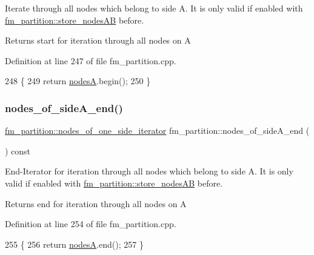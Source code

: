 Iterate through all nodes which belong to side {\ttfamily A}. It is only valid if enabled with \mbox{\hyperlink{classfm__partition_a8926005b4637055d2acf6f29ad2d9b97}{fm\+\_\+partition\+::store\+\_\+nodes\+AB}} before.

\begin{DoxyReturn}{Returns}
start for iteration through all nodes on {\ttfamily A} 
\end{DoxyReturn}


Definition at line 247 of file fm\+\_\+partition.\+cpp.


\begin{DoxyCode}
248 \{
249     \textcolor{keywordflow}{return} \mbox{\hyperlink{classfm__partition_acdcb82ae253e8eaf75a7efca3ca2b377}{nodesA}}.begin();
250 \}
\end{DoxyCode}
\mbox{\label{classfm__partition_ac4202d1d929c1700985ad5d452b735fb}} 
\subsubsection{\texorpdfstring{nodes\+\_\+of\+\_\+side\+A\+\_\+end()}{nodes\_of\_sideA\_end()}}
{\footnotesize\ttfamily \mbox{\hyperlink{classfm__partition_ad6cca73d48cc73d7bee1f52bf1c9a9fe}{fm\+\_\+partition\+::nodes\+\_\+of\+\_\+one\+\_\+side\+\_\+iterator}} fm\+\_\+partition\+::nodes\+\_\+of\+\_\+side\+A\+\_\+end (\begin{DoxyParamCaption}{ }\end{DoxyParamCaption}) const}

End-\/\+Iterator for iteration through all nodes which belong to side {\ttfamily A}. It is only valid if enabled with \mbox{\hyperlink{classfm__partition_a8926005b4637055d2acf6f29ad2d9b97}{fm\+\_\+partition\+::store\+\_\+nodes\+AB}} before.

\begin{DoxyReturn}{Returns}
end for iteration through all nodes on {\ttfamily A} 
\end{DoxyReturn}


Definition at line 254 of file fm\+\_\+partition.\+cpp.


\begin{DoxyCode}
255 \{
256     \textcolor{keywordflow}{return} \mbox{\hyperlink{classfm__partition_acdcb82ae253e8eaf75a7efca3ca2b377}{nodesA}}.end();
257 \}
\end{DoxyCode}
\mbox{\label{classfm__partition_a4e433456ed0214c04466c4f1060b0909}} 

